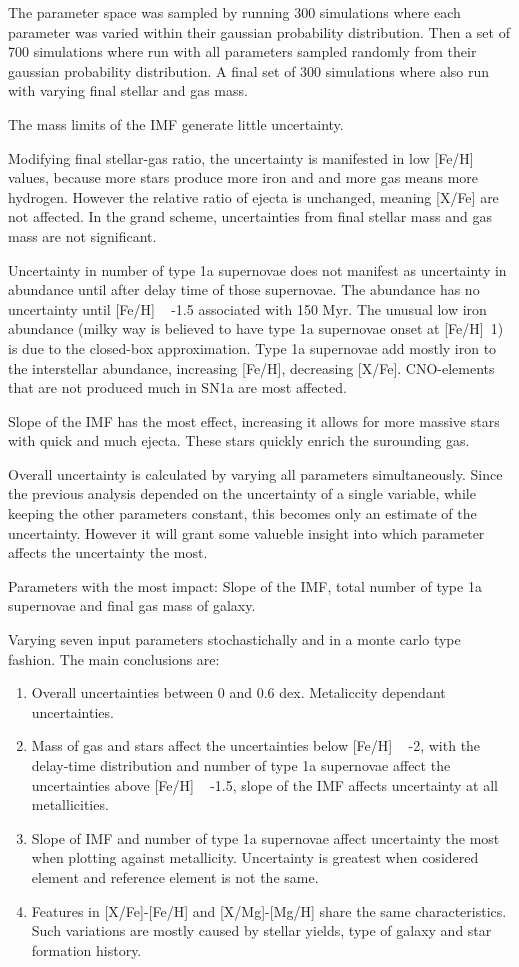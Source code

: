 The parameter space was sampled by running 300 simulations where each parameter was varied within their gaussian probability distribution.
Then a set of 700 simulations where run with all parameters sampled randomly from their gaussian probability distribution.
A final set of 300 simulations where also run with varying final stellar and gas mass.

The mass limits of the IMF generate little uncertainty.

Modifying final stellar-gas ratio, the uncertainty is manifested in low [Fe/H] values, because more stars produce more iron and and more gas means more hydrogen. However the relative ratio of ejecta is unchanged, meaning [X/Fe] are not affected.
In the grand scheme, uncertainties from final stellar mass and gas mass are not significant.

Uncertainty in number of type 1a supernovae does not manifest as uncertainty in abundance until after delay time of those supernovae.
The abundance has no uncertainty until [Fe/H] ~ -1.5 associated with 150 Myr.
The unusual low iron abundance (milky way is believed to have type 1a supernovae onset at [Fe/H]~1) is due to the closed-box
approximation.
Type 1a supernovae add mostly iron to the interstellar abundance, increasing [Fe/H], decreasing [X/Fe].
CNO-elements that are not produced much in SN1a are most affected.

Slope of the IMF has the most effect, increasing it allows for more massive stars with quick and much ejecta.
These stars quickly enrich the surounding gas.

Overall uncertainty is calculated by varying all parameters simultaneously.
Since the previous analysis depended on the uncertainty of a single variable, while keeping the other parameters constant,
this becomes only an estimate of the uncertainty. However it will grant some valueble insight into which parameter affects
the uncertainty the most.

Parameters with the most impact: Slope of the IMF, total number of type 1a supernovae and final gas mass of galaxy.

Varying seven input parameters stochastichally and in a monte carlo type fashion.
The main conclusions are:
\begin{enumerate}
\item{Overall uncertainties between 0 and 0.6 dex. Metaliccity dependant uncertainties.}
\item{Mass of gas and stars affect the uncertainties below [Fe/H] ~ -2,
  with the delay-time distribution and number of type 1a supernovae affect the uncertainties above [Fe/H] ~ -1.5,
  slope of the IMF affects uncertainty at all metallicities.}
\item{Slope of IMF and number of type 1a supernovae affect uncertainty the most when plotting against metallicity.
  Uncertainty is greatest when cosidered element and reference element is not the same. }
\item{Features in [X/Fe]-[Fe/H] and [X/Mg]-[Mg/H] share the same characteristics. Such variations
  are mostly caused by stellar yields, type of galaxy and star formation history.}
\end{enumerate}


